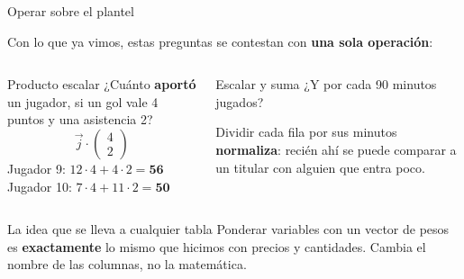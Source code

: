 \documentclass[aspectratio=169,10pt]{beamer}
\begin{document}
\begin{frame}{Operar sobre el plantel}

Con lo que ya vimos, estas preguntas se contestan con \textbf{una sola operación}:

\vspace{0.3cm}
\begin{columns}[T]
\begin{block}{Producto escalar}
¿Cuánto \textbf{aportó} un jugador, si un gol vale 4 puntos y una asistencia 2?
$$\vec{j} \cdot \begin{pmatrix} 4 \\ 2 \end{pmatrix}$$
Jugador 9: $12{\cdot}4 + 4{\cdot}2 = \mathbf{56}$ \\
Jugador 10: $7{\cdot}4 + 11{\cdot}2 = \mathbf{50}$
\end{block}

\begin{block}{Escalar y suma}
¿Y por cada 90 minutos jugados?

Dividir cada fila por sus minutos \textbf{normaliza}: recién ahí se puede comparar a un titular con
alguien que entra poco.
\end{block}
\end{columns}

\vspace{0.4cm}
\begin{alertblock}{La idea que se lleva a cualquier tabla}
Ponderar variables con un vector de pesos es \textbf{exactamente} lo mismo que hicimos con precios y
cantidades. Cambia el nombre de las columnas, no la matemática.
\end{alertblock}
\end{frame}
\end{document}
